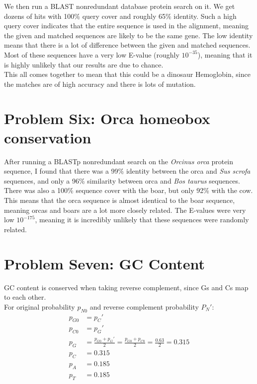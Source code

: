 \documentclass[10pt]{article} %
\begin{document}
We then run a BLAST nonredundant database protein search on it. We get dozens of hits with 100\%
query cover and roughly 65\% identity. Such a high query cover indicates that the entire sequence
is used in the alignment, meaning the given and matched sequences are likely to be the same gene.
The low identity means that there is a lot of difference between the given and matched sequences.
Most of these sequences have a very low E-value (roughly $10^{-35}$), meaning that it is highly
unlikely that our results are due to chance.\\

This all comes together to mean that this could be a dinosaur Hemoglobin, since the matches are
of high accuracy and there is lots of mutation.\\

\section{Problem Six: Orca homeobox conservation}
After running a BLASTp nonredundant search on the \textit{Orcinus orca} protein sequence, I found
that there was a 99\% identity between the orca and \textit{Sus scrofa} sequences, and only a
96\% similarity between orca and \textit{Bos taurus} sequences. There was also a 100\% sequence
cover with the boar, but only 92\% with the cow. This means that the orca sequence is almost
identical to the boar sequence, meaning orcas and boars are a lot more closely related. The
E-values were very low $10^{-175}$, meaning it is incredibly unlikely that these sequences were
randomly related.\\

\section{Problem Seven: GC Content}
GC content is conserved when taking reverse complement, since Gs and Cs map to
each other.\\

For original probability $p_{N0}$ and reverse complement probability $P_N'$:\\

\begin{align*}
  p_{G0} &= p_C'\\
  p_{C0} &= p_G'\\
  p_G &= \frac{p_{G0} + p_G'}{2} = \frac{p_{G0} + p_{C0}}{2} = \frac{0.63}{2} = 0.315\\
  p_C &= 0.315\\
  p_A &= 0.185\\
  p_T &= 0.185\\
\end{align*}
\end{document}
